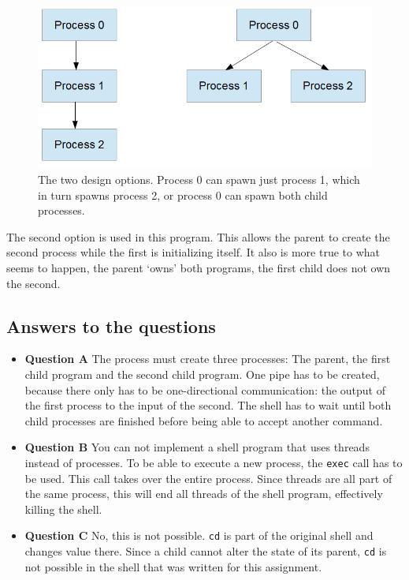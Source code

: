 \documentclass[a4paper]{article}
\begin{document}
\begin{figure}
    \includegraphics[scale=.5]{img/tree.png}
    \caption{The two design options. Process 0 can spawn just process 1, which in turn 
        spawns process 2, or process 0 can spawn both child processes.}
    \label{tree}
\end{figure}

The second option is used in this program. This allows the parent to create the second
process while the first is initializing itself. It also is more true to what seems to 
happen, the parent `owns' both programs, the first child does not own the second.

\subsection{Answers to the questions}

\begin{itemize}
    \item \textbf{Question A} The process must create three processes: The parent, the 
            first child program and the second child program. One pipe has to be created,
            because there only has to be one-directional communication: the output of the
            first process to the input of the second. The shell has to wait until both
            child processes are finished before being able to accept another command.
    \item \textbf{Question B} You can not implement a shell program that uses threads
            instead of processes. To be able to execute a new process, the \texttt{exec}
            call has to be used. This call takes over the entire process. Since threads
            are all part of the same process, this will end all threads of the shell 
            program, effectively killing the shell.
    \item \textbf{Question C} No, this is not possible. \texttt{cd} is part of the 
            original shell and changes value there. Since a child cannot alter the state
            of its parent, \texttt{cd} is not possible in the shell that was written for 
            this assignment.
\end{itemize}
\end{document}
